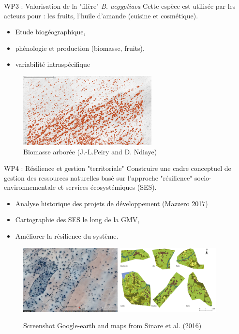 \documentclass[newPxFont]{beamer}
\begin{document}
\begin{frame}[c]{WP3 : Valorisation de la "filère" \textit{B. aegyptiaca}}
\vspace{-2em}
Cette espèce est utilisée par les acteurs pour  : les fruits, l'huile d'amande (cuisine et cosmétique).
\begin{itemize}
  \item Etude biogéographique,
  \item phénologie et production (biomasse, fruits),
  \item variabilité intraspécifique
\end{itemize}
\vspace{-1em}
\begin{figure}
	\centering
	\includegraphics[width = 7cm]{img/Biomasse_arboree}
  \vspace{-1em}
  \caption{Biomasse arborée (J.-L.Peiry and D. Ndiaye)}
\end{figure}
\end{frame}

\begin{frame}[c]{WP4 : Résilience et gestion "territoriale"}
\vspace{-2em}
Construire une cadre conceptuel de gestion des ressources naturelles basé sur l'approche "résilience" socio-environnementale et services écosystémiques (SES).
\begin{itemize}
  \item Analyse historique des projets de développement (Mazzero 2017)
  \item Cartographie des SES le long de la GMV,
  \item Améliorer la résilience du système.
\end{itemize}
\begin{figure}
	\centering
	\includegraphics[height = 3.5cm]{img/ggearth}
  \includegraphics[height = 3.5cm]{img/Sinare_et_al2016}
  \caption{\small{Screenshot Google-earth and maps from Sinare et al. (2016)}}
\end{figure}
\end{frame}
\end{document}
